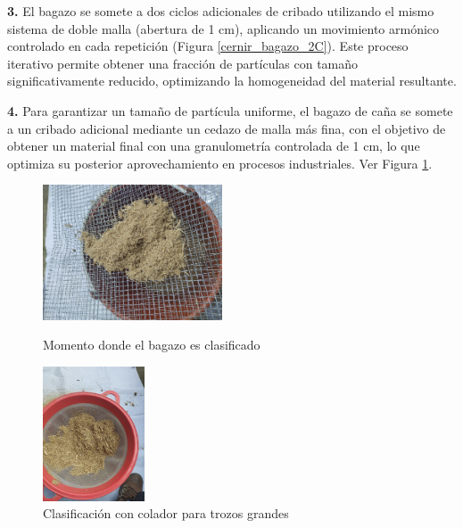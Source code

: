 \documentclass[12pt]{article}
\begin{document}
			
			
			
			
			\textbf{3.}	El bagazo se somete a dos ciclos adicionales de cribado utilizando el mismo sistema de doble malla (abertura de 1 cm), aplicando un movimiento armónico controlado en cada repetición (Figura \ref{cernir_bagazo_2C}). Este proceso iterativo permite obtener una fracción de partículas con tamaño significativamente reducido, optimizando la homogeneidad del material resultante.
			
			
			\textbf{4.} Para garantizar un tamaño de partícula uniforme, el bagazo de caña se somete a un cribado adicional mediante un cedazo de malla más fina, con el objetivo de obtener un material final con una granulometría controlada de 1 cm, lo que optimiza su posterior aprovechamiento en procesos industriales. Ver Figura \ref{cernir_bagazo_cedazo}.
		
		
			\begin{figure}[H]
			\centering
			\begin{minipage}{0.46\textwidth}
				\centering
			\includegraphics[width=\linewidth, height=4cm, keepaspectratio]{imagenes/cernir_bagazo_2}
			\caption{Momento donde el bagazo es clasificado}
			\label{cernir_bagazo_2C}
			\end{minipage}
			\hfill
			\begin{minipage}{0.48\textwidth}
				\centering
				\includegraphics[width=\linewidth, height=4cm, keepaspectratio]{imagenes/cernir_bagazo_cedazo}
				\caption{Clasificación con colador para trozos grandes}
				\label{cernir_bagazo_cedazo}
			\end{minipage}
		\end{figure}
		
\end{document}
